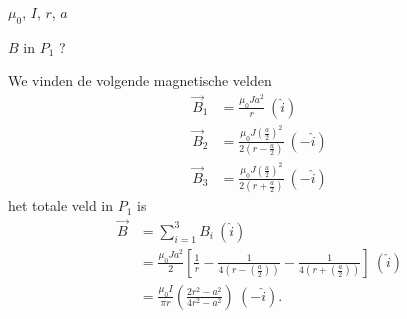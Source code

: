     \begin{minipage}[t]{.48\textwidth}
        \begin{description}[labelwidth=1.5cm, leftmargin=!]
            \item[Geg. :]  $\mu_0$, $I$, $r$, $a$
            \item[Gevr. :] $B$ in $P_1$ ?
            \item[Opl. :]  
            We vinden de volgende magnetische velden
            \begin{align*}
                \vec{B}_1 
                    &= \frac{\mu_0Ja^2}{r} \ (\hat{i}) \\
                \vec{B}_2
                    &= \frac{\mu_0J(\frac{a}{2})^2}{2\left(r - \frac{a}{2}\right)} \ (-\hat{i}) \\
                \vec{B}_3 
                    &= \frac{\mu_0J(\frac{a}{2})^2}{2\left(r + \frac{a}{2}\right)} \ (-\hat{i})
            \end{align*}
            het totale veld in $P_1$ is
            \begin{align*}
                \vec{B} 
                    &= \sum_{i=1}^3 B_i \ (\hat{i}) \\
                    &= \frac{\mu_0Ja^2}{2} \left[\frac{1}{r} - \frac{1}{4\left(r - \left(\frac{a}{2}\right)\right)} - \frac{1}{4\left(r + \left(\frac{a}{2}\right)\right)} \right] \ (\hat{i}) \\
                    &= \frac{\mu_0I}{\pi r}\left(\frac{2r^2-a^2}{4r^2-a^2}\right) \ (-\hat{i}).
            \end{align*}
        \end{description}    
    \end{minipage}%
